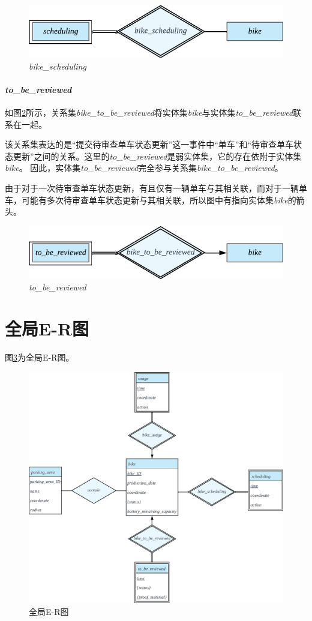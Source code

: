 \begin{figure}[!htbp]
    \centering
    \includegraphics[scale=1]{figures/scheduling.pdf}
    \caption{\textit{bike\_scheduling}}\label{scheduling}
\end{figure}

\paragraph{\textit{to\_be\_reviewed}}
如图\ref{review}所示，关系集\textit{bike\_to\_be\_reviewed}将实体集\textit{bike}与实体集\textit{to\_be\_reviewed}联系在一起。

该关系集表达的是“提交待审查单车状态更新”这一事件中“单车”和“待审查单车状态更新”之间的关系。这里的\textit{to\_be\_reviewed}是弱实体集，它的存在依附于实体集\textit{bike}。
因此，实体集\textit{to\_be\_reviewed}完全参与关系集\textit{bike\_to\_be\_reviewed}。

由于对于一次待审查单车状态更新，有且仅有一辆单车与其相关联，而对于一辆单车，可能有多次待审查单车状态更新与其相关联，所以图中有指向实体集\textit{bike}的箭头。
\begin{figure}[!htbp]
    \centering
    \includegraphics[scale=1]{figures/review.pdf}
    \caption{\textit{to\_be\_reviewed}}\label{review}
\end{figure}

\section{全局E-R图}
图\ref{ER}为全局E-R图。
\begin{figure}[!htbp]
    \centering
    \includegraphics[width=\textwidth]{figures/ER.pdf}
    \caption{全局E-R图}\label{ER}
\end{figure}

